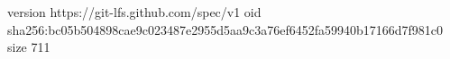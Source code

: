 version https://git-lfs.github.com/spec/v1
oid sha256:bc05b504898cae9c023487e2955d5aa9c3a76ef6452fa59940b17166d7f981c0
size 711
